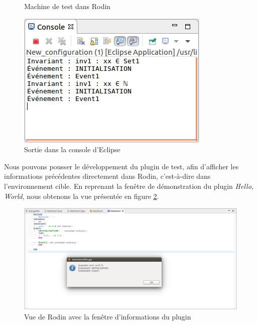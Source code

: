 \begin{figure}[H]
    \centering

    \begin{minipage}{.4\linewidth}
        \caption{Machine de test dans Rodin}
        \label{fig:rodinTestProject}
    \end{minipage}%
    \qquad\qquad%
    \begin{minipage}{.4\linewidth}
        \includegraphics{pictures/rodinPluginConsole.png}
        \caption{Sortie dans la console d'Eclipse}
        \label{fig:rodinPluginConsole}
    \end{minipage}
\end{figure}

Nous pouvons pousser le développement du plugin de test, afin d'afficher les informations précédentes directement dans Rodin, c'est-à-dire dans l'environnement cible.
En reprenant la fenêtre de démonstration du plugin \textit{Hello, World}, nous obtenons la vue présentée en figure \ref{fig:rodinPluginWindow}.


\begin{figure}[H]
    \centering
    \includegraphics{pictures/rodinPluginWindow.png}
    \caption{Vue de Rodin avec la fenêtre d'informations du plugin}
    \label{fig:rodinPluginWindow}
\end{figure}
